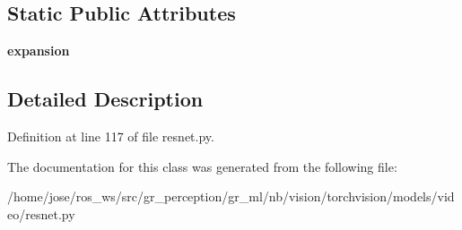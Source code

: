 \subsection*{Static Public Attributes}
\begin{DoxyCompactItemize}
\item 
\mbox{\label{classtorchvision_1_1models_1_1video_1_1resnet_1_1Bottleneck_aa04ab8651278815446c34b01621421c1}} 
{\bfseries expansion}
\end{DoxyCompactItemize}


\subsection{Detailed Description}


Definition at line 117 of file resnet.\+py.



The documentation for this class was generated from the following file\+:\begin{DoxyCompactItemize}
\item 
/home/jose/ros\+\_\+ws/src/gr\+\_\+perception/gr\+\_\+ml/nb/vision/torchvision/models/video/resnet.\+py\end{DoxyCompactItemize}
